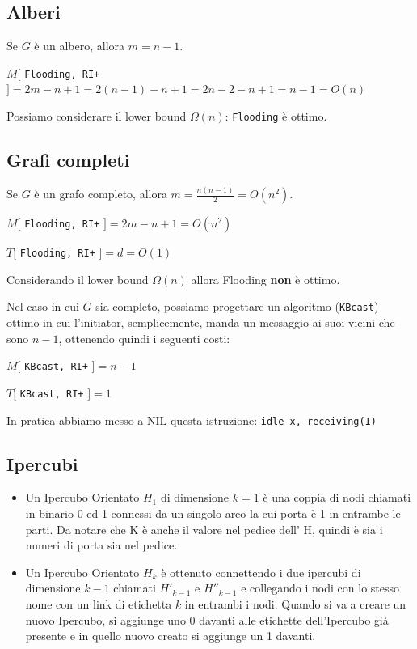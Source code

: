 \subsection{Alberi}
Se $G$ è un albero, allora $m=n-1$.

\begin{center}
    $M[$ \texttt{Flooding, RI+} $] = 2m -n+1 = 2(n-1) -n+1 =  2n-2-n+1 = n-1 =
        O(n)$
\end{center}

Possiamo considerare il lower bound $\Omega(n)$: \texttt{Flooding} è ottimo.

\subsection{Grafi completi}
Se $G$ è un grafo completo, allora $m = \frac{n(n-1)}{2} = O(n^2)$.

\begin{center}
    $M[$ \texttt{Flooding, RI+} $] = 2m-n+1 = O(n^2)$

    $T[$ \texttt{Flooding, RI+} $] = d = O(1)$
\end{center}

Considerando il lower bound $\Omega(n)$ allora Flooding \textbf{non} è ottimo.

Nel caso in cui $G$ sia completo, possiamo progettare un algoritmo
(\texttt{KBcast}) ottimo in cui l'initiator, semplicemente, manda un messaggio
ai suoi vicini che sono $n-1$, ottenendo quindi i seguenti costi:
\begin{center}
    $M[$ \texttt{KBcast, RI+} $] = n-1$

    $T[$ \texttt{KBcast, RI+} $] = 1$
\end{center}

In pratica abbiamo messo a NIL questa istruzione: \texttt{idle x, receiving(I)}

\subsection{Ipercubi}
\begin{itemize}
    \item Un Ipercubo Orientato $H_1$ di dimensione $k=1$ è una coppia di nodi
          chiamati in binario 0 ed 1 connessi da un singolo arco la cui porta è 1 in
          entrambe le parti. Da notare che K è anche il valore nel pedice dell' H,
          quindi è sia i numeri di porta sia nel pedice.
    \item Un Ipercubo Orientato $H_k$ è ottenuto connettendo i due ipercubi di
          dimensione $k-1$ chiamati $H'_{k-1}$ e $H''_{k-1}$ e collegando i nodi con lo
          stesso nome con un link di etichetta $k$ in entrambi i nodi. Quando si va a
          creare un nuovo Ipercubo, si aggiunge uno 0 davanti alle etichette
          dell'Ipercubo già presente e in quello nuovo creato si aggiunge un 1 davanti.
\end{itemize}

